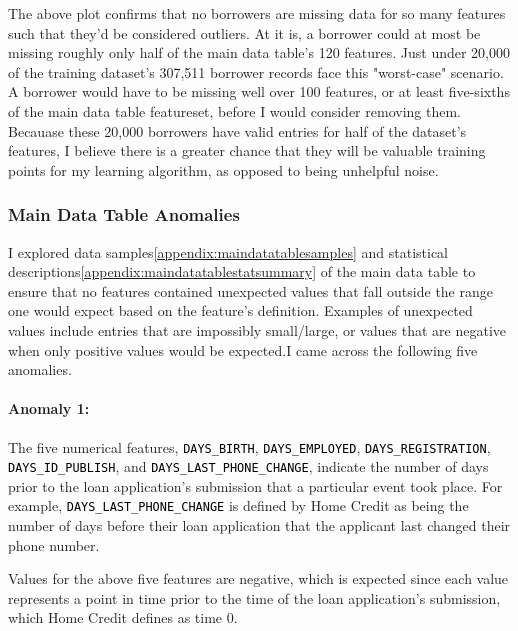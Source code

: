 \documentclass[12pt, letterpaper]{article}
\begin{document}
The above plot confirms that no borrowers are missing data for so many features such that they'd be considered outliers. At it is, a borrower could at most be missing roughly only half of the main data table's 120 features. Just under 20,000 of the training dataset's 307,511 borrower records face this "worst-case" scenario. A borrower would have to be missing well over 100 features, or at least five-sixths of the main data table featureset, before I would consider removing them. Becauase these 20,000 borrowers have valid entries for half of the dataset's features, I believe there is a greater chance that they will be valuable training points for my learning algorithm, as opposed to being unhelpful noise.

\subsubsection{Main Data Table Anomalies}
I explored data samples\ref{appendix:maindatatablesamples} and statistical descriptions\ref{appendix:maindatatablestatsummary} of the main data table to ensure that no features contained unexpected values that fall outside the range one would expect based on the feature's definition. Examples of unexpected values include entries that are impossibly small/large, or values that are negative when only positive values would be expected.I came across the following five anomalies.

\paragraph{Anomaly 1:}
The five numerical features, \colorbox{backcolor}{\textcolor{black}{\texttt{DAYS_BIRTH}}}, \colorbox{backcolor}{\textcolor{black}{\texttt{DAYS_EMPLOYED}}}, \colorbox{backcolor}{\textcolor{black}{\texttt{DAYS_REGISTRATION}}}, \colorbox{backcolor}{\textcolor{black}{\texttt{DAYS_ID_PUBLISH}}}, and \colorbox{backcolor}{\textcolor{black}{\texttt{DAYS_LAST_PHONE_CHANGE}}}, indicate the number of days prior to the loan application's submission that a particular event took place. For example, \colorbox{backcolor}{\textcolor{black}{\texttt{DAYS_LAST_PHONE_CHANGE}}} is defined by Home Credit as being the number of days before their loan application that the applicant last changed their phone number.

Values for the above five features are negative, which is expected since each value represents a point in time prior to the time of the loan application's submission, which Home Credit defines as time 0.
\end{document}
